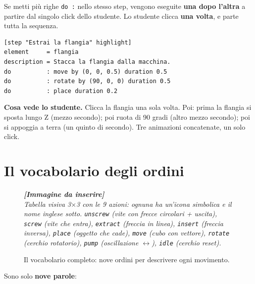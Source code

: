﻿\documentclass[a4paper,12pt,oneside]{book}
\newcommand{\kw}[1]{\texttt{\color{keycolor}#1}}
\newcommand{\imgph}[2]{%
  \begin{tcolorbox}[colback=cvtlightblue!30,colframe=cvtblue!40,%
    width=#1,halign=center,valign=center,height=5cm,boxrule=0.5pt,arc=3pt]%
    \textcolor{cvtgray}{\itshape\footnotesize\textbf{[Immagine da inserire]}\\[3pt]#2}%
  \end{tcolorbox}}
\begin{document}
Se metti più righe \kw{do :} nello stesso step, vengono eseguite
\textbf{una dopo l'altra} a partire dal singolo click dello studente. Lo
studente clicca \textbf{una volta}, e parte tutta la sequenza.

\begin{lstlisting}
[step "Estrai la flangia" highlight]
element     = flangia
description = Stacca la flangia dalla macchina.
do          : move by (0, 0, 0.5) duration 0.5
do          : rotate by (90, 0, 0) duration 0.5
do          : place duration 0.2
\end{lstlisting}

\textbf{Cosa vede lo studente.} Clicca la flangia una sola volta. Poi:
prima la flangia si sposta lungo Z (mezzo secondo); poi ruota di 90 gradi
(altro mezzo secondo); poi si appoggia a terra (un quinto di secondo). Tre
animazioni concatenate, un solo click.

\section{Il vocabolario degli ordini}

\begin{figure}[H]
  \centering
  \imgph{13cm}{Tabella visiva 3$\times$3 con le 9 azioni: ognuna ha un'icona simbolica e il nome inglese sotto. \texttt{unscrew} (vite con frecce circolari + uscita), \texttt{screw} (vite che entra), \texttt{extract} (freccia in linea), \texttt{insert} (freccia inversa), \texttt{place} (oggetto che cade), \texttt{move} (cubo con vettore), \texttt{rotate} (cerchio rotatorio), \texttt{pump} (oscillazione $\leftrightarrow$), \texttt{idle} (cerchio reset).}
  \caption{Il vocabolario completo: nove ordini per descrivere ogni movimento.}
  \label{fig:9-azioni}
\end{figure}

Sono solo \textbf{nove parole}:
\end{document}
